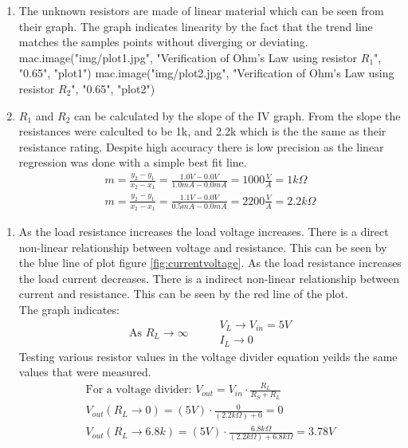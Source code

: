 {%

{%
{%
\begin{enumerate}
  \item The unknown resistors are made of linear material which can be seen from their graph.
  The graph indicates linearity by the fact that the trend line matches the
  samples points without diverging or deviating.
  {{ mac.image("img/plot1.jpg", "Verification of Ohm's Law using resistor $R_1$", "0.65", "plot1")}}
  {{ mac.image("img/plot2.jpg", "Verification of Ohm's Law using resistor $R_2$", "0.65", "plot2")}}
  \item $R_1$ and $R_2$ can be calculated by the slope of the IV graph.
  From the slope the resistances were calculted to be 1k, and 2.2k which is the
  the same as their resistance rating. Despite high accuracy there is low precision as
  the linear regression was done with a simple best fit line.
  \begin{gather}
    m = \frac{y_2-y_1}{x_2-x_1} = \frac{1.0 V - 0.0 V}{1.0 mA - 0.0 mA} = 1000 \frac{V}{A} = 1 k \Omega \\
    m = \frac{y_2-y_1}{x_2-x_1} = \frac{1.1 V - 0.0 V}{0.5 mA - 0.0 mA} = 2200 \frac{V}{A} = 2.2 k \Omega
  \end{gather}
\end{enumerate}
{%

{%
\newpage
\begin{enumerate}
  \item As the load resistance increases the load voltage increases.
  There is a direct non-linear relationship between voltage and resistance. This can be seen by the blue line of plot
  figure \ref{fig:currentvoltage}. As the load resistance increases the load current decreases.
  There is a indirect non-linear relationship between current and resistance. This can be seen by the red line of the plot.\\
  The graph indicates:
  \begin{equation}
    \text{ As } R_L \to \infty \hspace{1cm} \begin{matrix}
    V_L \to V_{in} = 5 V \\
    I_L \to 0
  \end{matrix}
  \end{equation}
  Testing various resistor values in the voltage divider equation yeilds the same
  values that were measured.
  \begin{gather}
    \text{For a voltage divider: } V_{out} = V_{in} \cdot \frac{R_L}{R_S+R_L} \\
    V_{out}(R_L \to 0) = (5 V) \cdot \frac{0}{(2.2 k \Omega)+0} = 0 \\
    V_{out}(R_L \to 6.8k ) = (5 V) \cdot \frac{6.8 k \Omega}{(2.2 k \Omega)+ 6.8 k \Omega} = 3.78V
  \end{gather}




\end{enumerate}}}}}}
